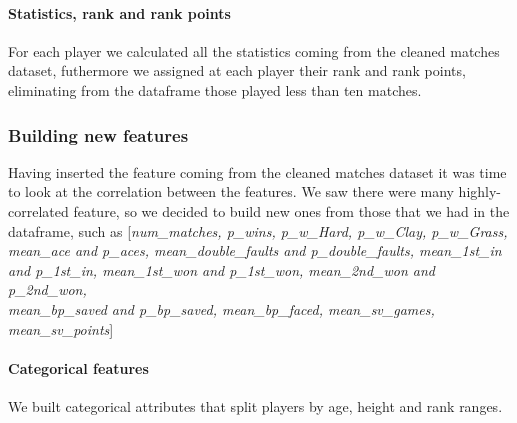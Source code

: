 \paragraph{Statistics, rank and rank points} For each player we calculated all the statistics coming from the cleaned matches dataset, futhermore we assigned at each player their rank and rank points, eliminating from the dataframe those played less than ten matches.

\subsubsection{Building new features}

Having inserted the feature coming from the cleaned matches dataset it was time to look at the correlation between the features. We saw there were many highly-correlated feature, so we decided to build new ones from those that we had in the dataframe, such as [\textit{num\_matches, p\_wins, p\_w\_Hard, p\_w\_Clay, p\_w\_Grass, mean\_ace and p\_aces, mean\_double\_faults and p\_double\_faults, mean\_1st\_in and p\_1st\_in, mean\_1st\_won and p\_1st\_won, mean\_2nd\_won and p\_2nd\_won,\\mean\_bp\_saved and p\_bp\_saved, mean\_bp\_faced, mean\_sv\_games, mean\_sv\_points}]

\paragraph{Categorical features} We built categorical attributes that split players by age, height and rank ranges.
\vspace{3mm}

